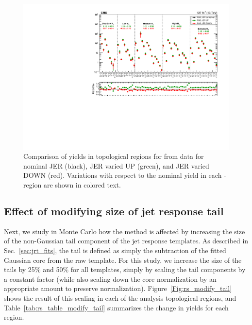 \begin{figure}[ht]
  \begin{center}
    \includegraphics[width=1.0\textwidth]{figs/qcd/rs_data/data_JER_systVar.pdf}
    \caption{Comparison of yields in topological regions for \rs from data for nominal JER (black), JER varied UP (green), and JER varied DOWN (red). Variations with respect to the nominal yield
      in each \Ht-region are shown in colored text.
            }
    \label{Fig:rs_data_JER_var}
  \end{center}
\end{figure}


\subsection{Effect of modifying size of jet response tail}
\label{sec:rs_jrt_tail}

Next, we study in Monte Carlo how the \rs method is affected by increasing the size of the non-Gaussian tail component of the jet response templates.
As described in Sec.~\ref{sec:jrt_fits}, the tail is defined as simply the subtraction of the fitted Gaussian core from the raw template.
For this study, we increase the size of the tails by 25\% and 50\% for all templates, simply by scaling the tail components by a constant factor
(while also scaling down the core normalization by an appropriate amount to preserve normalization).
Figure~\ref{Fig:rs_modify_tail} shows the result of this scaling in each of the analysis topological regions, and Table~\ref{tab:rs_table_modify_tail}
summarizes the change in yields for each \Ht region.

